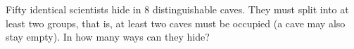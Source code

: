 Fifty identical scientists hide in $8$ distinguishable caves. They must split into at least two groups, that is, at least two caves must be occupied (a cave may also stay empty). In how many ways can they hide?
